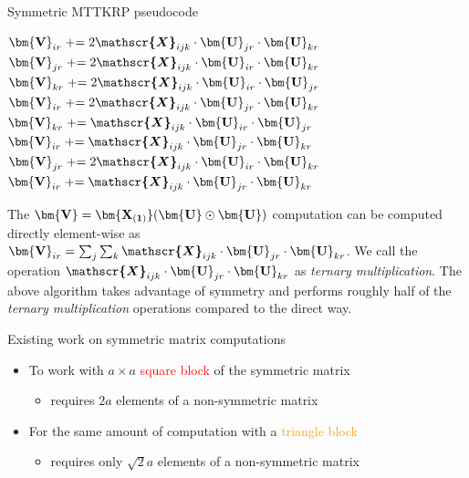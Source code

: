 \documentclass[final]{beamer}
\newlength{\colwidth}
\newcommand{\M}[2][]{{\bm{#1\mathbf{\MakeUppercase{#2}}}}}
\newcommand{\T}[2][]{\boldsymbol{#1\mathscr{\MakeUppercase{#2}}}}
\newcommand{\arraymul}{\emph{ternary multiplication}\xspace}
\newcommand{\pluseq}{\mathrel{+}=}
\begin{document}
\begin{frame}[t]
\begin{columns}[t]
\begin{column}{\colwidth}
\begin{block}{Symmetric MTTKRP pseudocode}
\begin{algorithmic}
			\State $\M{V}_{ir} \pluseq 2\T{X}_{ijk}\cdot \M{U}_{jr} \cdot \M{U}_{kr}$
			\State $\M{V}_{jr} \pluseq 2\T{X}_{ijk}\cdot \M{U}_{ir} \cdot \M{U}_{kr}$
			\State $\M{V}_{kr} \pluseq 2\T{X}_{ijk}\cdot \M{U}_{ir} \cdot \M{U}_{jr}$
			\State $\M{V}_{ir} \pluseq 2\T{X}_{ijk}\cdot \M{U}_{jr} \cdot \M{U}_{kr}$
			\State $\M{V}_{kr} \pluseq \T{X}_{ijk}\cdot \M{U}_{ir} \cdot \M{U}_{jr}$
			\State $\M{V}_{ir} \pluseq \T{X}_{ijk}\cdot \M{U}_{jr} \cdot \M{U}_{kr}$
			\State $\M{V}_{jr} \pluseq 2\T{X}_{ijk}\cdot \M{U}_{ir} \cdot \M{U}_{kr}$
			\Else{}
			\State $\M{V}_{ir} \pluseq \T{X}_{ijk}\cdot \M{U}_{jr} \cdot \M{U}_{kr}$
			\EndIf
			\EndFor
			\EndFor
			\EndFor
			\EndFor
		\end{algorithmic}
	The $\M{V} = \M{X_{(1)}} (\M{U}\odot \M{U})$ computation can be computed directly element-wise as $\M{V}_{ir} =\sum_{j}\sum_{k} \T{X}_{ijk}\cdot \M{U}_{jr} \cdot \M{U}_{kr}$. We call the operation $\T{X}_{ijk}\cdot \M{U}_{jr} \cdot \M{U}_{kr}$ as \arraymul. The above algorithm takes advantage of symmetry and performs roughly half of the \arraymul operations compared to the direct way.

\end{block}

\begin{block}{Existing work on symmetric matrix computations}
	\begin{minipage}{0.725\linewidth}
		\begin{itemize}
			\item To work with $a\times a$ \textcolor{red}{square block} of the symmetric matrix
			\begin{itemize}
				\item requires $2a$ elements of a non-symmetric matrix
			\end{itemize}
			\item For the same amount of computation with a \textcolor{orange}{triangle block}
			\begin{itemize}
				\item requires only $\sqrt{2}a$ elements of a non-symmetric matrix
			\end{itemize}
		\end{itemize}
	\end{minipage}\hfill
\begin{minipage}{0.265\linewidth}
	\begin{tikzpicture}[scale=0.75]


\end{tikzpicture}
\end{minipage}
\end{block}
\end{column}
\end{columns}
\end{frame}
\end{document}
